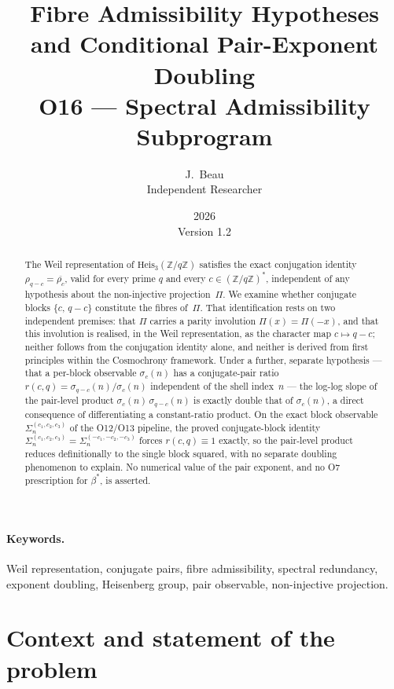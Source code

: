\documentclass[11pt,a4paper]{article}
\title{Fibre Admissibility Hypotheses and Conditional Pair-Exponent Doubling\\
\large O16 --- Spectral Admissibility Subprogram}
\author{J.~Beau\\
\small Independent Researcher}
\date{2026\\Version 1.2}
\theoremstyle{definition}
\newcommand{\bstar}{\beta^*}
\newcommand{\Heis}{\mathrm{Heis}_3}
\newcommand{\ZqZ}{\mathbb{Z}/q\mathbb{Z}}
\newcommand{\Fq}{(\mathbb{Z}/q\mathbb{Z})^*}
\begin{document}
  \maketitle

  \begin{abstract}
    \vspace{0.5em}
    The Weil representation of $\Heis(\ZqZ)$ satisfies the exact
    conjugation identity $\rho_{q-c} = \overline{\rho_c}$, valid for every
    prime $q$ and every $c \in \Fq$, independent of any hypothesis about
    the non-injective projection~$\Pi$.
    We examine whether conjugate blocks $\{c,\,q-c\}$ constitute the
    fibres of~$\Pi$.
    That identification rests on two independent premises: that $\Pi$
    carries a parity involution $\Pi(x)=\Pi(-x)$, and that this involution
    is realised, in the Weil representation, as the character map
    $c \mapsto q-c$; neither follows from the conjugation identity alone,
    and neither is derived from first principles within the Cosmochrony
    framework.
    Under a further, separate hypothesis --- that a per-block observable
    $\sigma_c(n)$ has a conjugate-pair ratio
    $r(c,q) = \sigma_{q-c}(n)/\sigma_c(n)$ independent of the shell
    index~$n$ --- the log-log slope of the pair-level product
    $\sigma_c(n)\,\sigma_{q-c}(n)$ is exactly double that of $\sigma_c(n)$,
    a direct consequence of differentiating a constant-ratio product.
    On the exact block observable $\Sigma_n^{(c_1,c_2,c_3)}$ of the
    O12/O13 pipeline, the proved conjugate-block identity
    $\Sigma_n^{(c_1,c_2,c_3)} = \Sigma_n^{(-c_1,-c_2,-c_3)}$ forces
    $r(c,q) \equiv 1$ exactly, so the pair-level product reduces
    definitionally to the single block squared, with no separate doubling
    phenomenon to explain.
    No numerical value of the pair exponent, and no O7 prescription for
    $\bstar$, is asserted.
  \end{abstract}

  \paragraph{Keywords.}
    Weil representation, conjugate pairs, fibre admissibility, spectral redundancy, exponent doubling,
    Heisenberg group, pair observable, non-injective projection.

    \clearpage
    \tableofcontents

    \clearpage

  \section{Context and statement of the problem}
  \label{sec:context}
\end{document}
